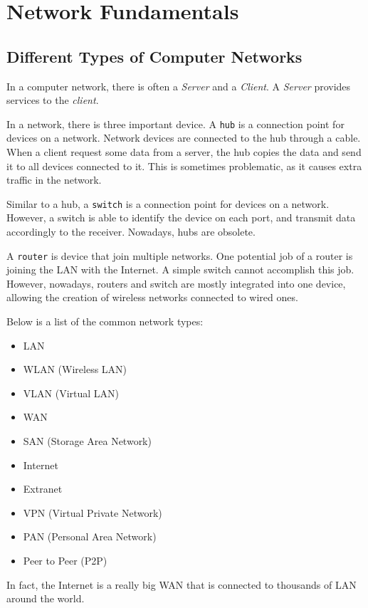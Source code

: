 \documentclass[../notes.tex]{subfiles}
\begin{document}
\section{Network Fundamentals}

\subsection{Different Types of Computer Networks}
In a computer network, there is often a \textit{Server} and a \textit{Client}. 
A \textit{Server} provides services to the \textit{client}.

In a network, there is three important device.
A \texttt{hub} is a connection point for devices on a network. 
Network devices are connected to the hub through a cable.
When a client request some data from a server, the hub copies the data and send it to all devices connected to it. 
This is sometimes problematic, as it causes extra traffic in the network.

Similar to a hub, a \texttt{switch} is a connection point for devices on a network.
However, a switch is able to identify the device on each port, and transmit data accordingly to the receiver.
Nowadays, hubs are obsolete.

A \texttt{router} is device that join multiple networks.
One potential job of a router is joining the LAN with the Internet.
A simple switch cannot accomplish this job.
However, nowadays, routers and switch are mostly integrated into one device, allowing the creation of wireless networks connected to wired ones.

Below is a list of the common network types:
\begin{itemize}
	\item LAN
	\item WLAN (Wireless LAN)
	\item VLAN (Virtual LAN)
	\item WAN
	\item SAN (Storage Area Network)
	\item Internet
	\item Extranet
	\item VPN (Virtual Private Network)
	\item PAN (Personal Area Network)
	\item Peer to Peer (P2P)
\end{itemize}

In fact, the Internet is a really big WAN that is connected to thousands of LAN around the world.
\end{document}
